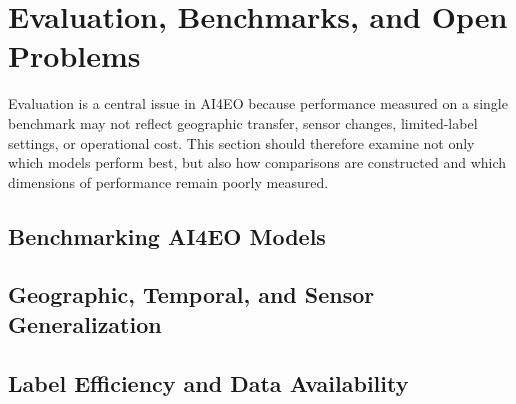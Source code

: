 \documentclass[
    11pt,
    a4paper,
    parskip=half,
    bibliography=totoc,
    numbers=noenddot
]{scrartcl}
\begin{document}

\section{Evaluation, Benchmarks, and Open Problems}

Evaluation is a central issue in AI4EO because performance measured on a
single benchmark may not reflect geographic transfer, sensor changes,
limited-label settings, or operational cost. This section should
therefore examine not only which models perform best, but also how
comparisons are constructed and which dimensions of performance remain
poorly measured.

\subsection{Benchmarking AI4EO Models}


\subsection{Geographic, Temporal, and Sensor Generalization}


\subsection{Label Efficiency and Data Availability}

\end{document}
